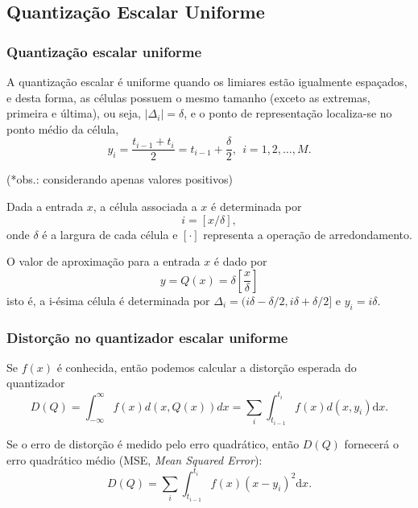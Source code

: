 \subsection{Quantização Escalar Uniforme}
\begin{frame}[allowframebreaks]
   \frametitle{Quantização escalar uniforme}
  A quantização escalar é uniforme quando os limiares estão igualmente espaçados,
  e desta forma, as células possuem o mesmo tamanho (exceto as extremas, primeira e última),
  ou seja, $\vert \Delta_i \vert = \delta$, e o ponto de representação localiza-se no 
  ponto médio da célula,
  \begin{equation}
  y_i = \frac{t_{i-1} + t_i}{2} = t_{i-1} + \frac{\delta}{2} , \ \ i=1,2,\ldots,M .
  \end{equation}

  \framebreak

  (*obs.: considerando apenas valores positivos)

  Dada a entrada $x$, a célula associada a $x$ é determinada por
  \begin{equation}
  i = [x / \delta ] ,
  \end{equation}
  onde $\delta$ é a largura de cada célula e $[ \cdot ]$ representa a operação
  de arredondamento.
 
  O valor de aproximação para a entrada $x$ é dado por
  \begin{equation}
  y = Q(x) = \delta \left[ \frac{x}{\delta} \right]   
  \end{equation}
  isto é, a i-ésima célula é determinada por $\Delta_i = (i\delta - \delta/2, i\delta + \delta/2]$
  e $y_i = i\delta$.

\end{frame}

\begin{frame}%
   \frametitle{Distorção no quantizador escalar uniforme}
  Se $f(x)$ é conhecida, então podemos calcular a distorção esperada do quantizador
  \begin{equation}
  D(Q) = \int_{-\infty}^{\infty} f(x) d(x,Q(x)) dx = \sum_i \int_{t_{i-1}}^{t_i} f(x) d(x,y_i) \mathrm{d}x .
  \end{equation}

  Se o erro de distorção é medido pelo erro quadrático, então $D(Q)$ fornecerá o 
  erro quadrático médio (MSE, \textit{Mean Squared Error}):
  \begin{equation}
  D(Q) = \sum_i \int_{t_{i-1}}^{t_i} f(x) (x - y_i)^2 \mathrm{d}x .
  \end{equation}
\end{frame}




